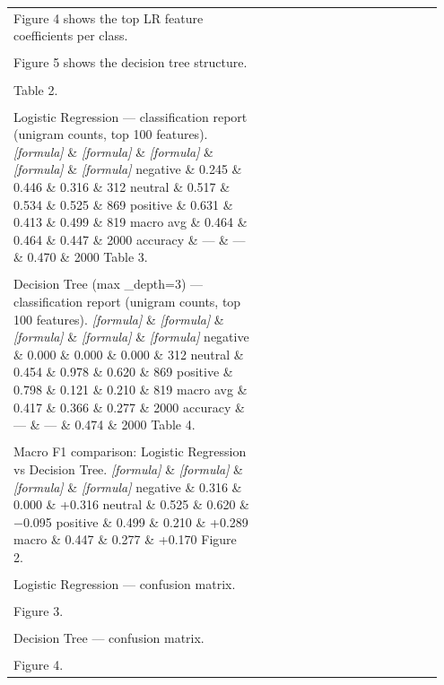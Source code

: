 \documentclass[11pt]{article}
\begin{document}
\begin{longtable}{|p{0.55\linewidth}|p{0.40\linewidth}|}
\hline
\rule{0pt}{3.5cm} & \\
\hline
Figure 4 shows the top LR feature coefficients per class. & \\[2pt]
\hline
\rule{0pt}{3.5cm} & \\
\hline
Figure 5 shows the decision tree structure. & \\[2pt]
\hline
\rule{0pt}{3.5cm} & \\
\hline
Table 2. & \\[2pt]
\hline
\rule{0pt}{3.5cm} & \\
\hline
Logistic Regression --- classification report (unigram counts, top 100 features). \textit{[formula]} \& \textit{[formula]} \& \textit{[formula]} \& \textit{[formula]} \& \textit{[formula]} negative \& 0.245 \& 0.446 \& 0.316 \& 312 neutral \& 0.517 \& 0.534 \& 0.525 \& 869 positive \& 0.631 \& 0.413 \& 0.499 \& 819 macro avg \& 0.464 \& 0.464 \& 0.447 \& 2000 accuracy \& --- \& --- \& 0.470 \& 2000 Table 3. & \\[2pt]
\hline
\rule{0pt}{3.5cm} & \\
\hline
Decision Tree (max \_depth=3) --- classification report (unigram counts, top 100 features). \textit{[formula]} \& \textit{[formula]} \& \textit{[formula]} \& \textit{[formula]} \& \textit{[formula]} negative \& 0.000 \& 0.000 \& 0.000 \& 312 neutral \& 0.454 \& 0.978 \& 0.620 \& 869 positive \& 0.798 \& 0.121 \& 0.210 \& 819 macro avg \& 0.417 \& 0.366 \& 0.277 \& 2000 accuracy \& --- \& --- \& 0.474 \& 2000 Table 4. & \\[2pt]
\hline
\rule{0pt}{3.5cm} & \\
\hline
Macro F1 comparison: Logistic Regression vs Decision Tree. \textit{[formula]} \& \textit{[formula]} \& \textit{[formula]} \& \textit{[formula]} negative \& 0.316 \& 0.000 \& +0.316 neutral \& 0.525 \& 0.620 \& −0.095 positive \& 0.499 \& 0.210 \& +0.289 macro \& 0.447 \& 0.277 \& +0.170 Figure 2. & \\[2pt]
\hline
\rule{0pt}{3.5cm} & \\
\hline
Logistic Regression --- confusion matrix. & \\[2pt]
\hline
\rule{0pt}{3.5cm} & \\
\hline
Figure 3. & \\[2pt]
\hline
\rule{0pt}{3.5cm} & \\
\hline
Decision Tree --- confusion matrix. & \\[2pt]
\hline
\rule{0pt}{3.5cm} & \\
\hline
Figure 4. & \\[2pt]

\end{longtable}
\end{document}
